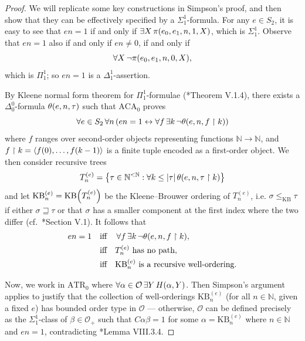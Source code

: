 \documentclass[12pt,openany]{book}
\theoremstyle{plain}
\theoremstyle{definition}
\newcommand\tuple[1]{\left\langle #1 \right\rangle}
\newcommand\opA[1]{\mathop{\forall #1}}
\newcommand\opE[1]{\mathop{\exists #1}}
\newcommand\ATR{\mathrm{ATR}}
\newcommand\KB{\mathrm{KB}}
\begin{document}
\begin{proof}
  We will replicate some key constructions in Simpson's proof, and then show that they can be effectively specified by a $\Sigma^1_1$-formula. For any $e \in S_2$, it is easy to see that $en = 1$ if and only if $\opE{X} \pi\mleft(e_0, e_1, n, 1, X\mright)$, which is $\Sigma^1_1$. Observe that $en = 1$ also if and only if $en \neq 0$, if and only if
  \[\opA{X} \neg \pi\mleft(e_0, e_1, n, 0, X\mright),\]
  which is $\Pi^1_1$; so $en = 1$ is a $\Delta^1_1$-assertion.

  By Kleene normal form theorem for $\Pi^1_1$-formulae (\cite{simpson09-soa}*{Theorem V.1.4}), there exists a $\Delta^0_0$-formula $\theta\mleft(e, n, \tau\mright)$ such that $\mathrm{ACA}_0$ proves
  \[\opA{e \in S_2} \opA{n} \left(en = 1 \leftrightarrow \opA{f} \opE{k} \neg \theta\mleft(e, n, f \upharpoonright k\mright)\right)\]
  where $f$ ranges over second-order objects representing functions $\mathbb{N} \rightarrow \mathbb{N}$, and $f \upharpoonright k = \tuple{f\mleft(0\mright), \ldots, f\mleft(k - 1\mright)}$ is a finite tuple encoded as a first-order object. We then consider recursive trees
  \[T^{(e)}_n = \left\{\tau \in \mathbb{N}^{< \mathbb{N}} : \opA{k \leq \left|\tau\right|} \theta\mleft(e, n, \tau \upharpoonright k\mright)\right\}\]
  and let $\KB^{(e)}_n = \KB\mleft(T^{(e)}_n\mright)$ be the Kleene--Brouwer ordering of $T^{(e)}_n$, i.e. $\sigma \leq_\KB \tau$ if either $\sigma \sqsupseteq \tau$ or that $\sigma$ has a smaller component at the first index where the two differ (cf.\ \cite{simpson09-soa}*{Section V.1}). It follows that
  \begin{align*}
    en = 1 \quad & \text{iff} \quad \opA{f} \opE{k} \neg \theta\mleft(e, n, f \upharpoonright k\mright), \\
                 & \text{iff} \quad \text{$T^{(e)}_n$ has no path},                                      \\
                 & \text{iff} \quad \text{$\KB^{(e)}_n$ is a recursive well-ordering}.
  \end{align*}

  Now, we work in $\ATR_0$ where $\opA{\alpha \in \mathcal{O}} \opE{Y} H\mleft(\alpha, Y\mright)$. Then Simpson's argument applies to justify that the collection of well-orderings $\KB^{(e)}_n$ (for all $n \in \mathbb{N}$, given a fixed $e$) has bounded order type in $\mathcal{O}$ --- otherwise, $\mathcal{O}$ can be defined precisely as the $\Sigma^1_1$-class of $\beta \in \mathcal{O}_+$ such that $C\alpha\beta = 1$ for some $\alpha = \KB^{(e)}_n$ where $n \in \mathbb{N}$ and $en = 1$, contradicting \cite{simpson09-soa}*{Lemma VIII.3.4}.


\end{proof}
\end{document}
